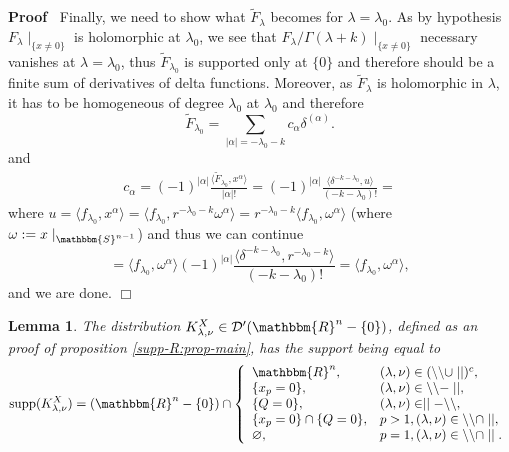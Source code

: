 \documentclass[12pt]{article}
\newcommand{\assign}{:=}
\newcommand{\tmop}[1]{\ensuremath{\operatorname{#1}}}
\renewenvironment{proof}{\noindent\textbf{Proof\ }}{\hspace*{\fill}$\Box$\medskip}
\newtheorem{lemma}[proposition]{Lemma}
\theoremstyle{remark}
\begin{document}
\begin{proof}
  Finally, we need to show what $\tilde{F}_{\lambda}$ becomes for $\lambda =
  \lambda_0$. As by hypothesis $F_{\lambda} \mid_{\{ x \neq 0 \}}$ is
  holomorphic at $\lambda_0$, we see that $F_{\lambda} / \Gamma (\lambda + k)
  \mid_{\{ x \neq 0 \}}$ necessary vanishes at $\lambda = \lambda_0$, thus
  $\tilde{F}_{\lambda_0}$ is supported only at $\{ 0 \}$ and therefore should
  be a finite sum of derivatives of delta functions. Moreover, as
  $\tilde{F}_{\lambda}$ is holomorphic in $\lambda$, it has to be homogeneous
  of degree $\lambda_0$ at $\lambda_0$ and therefore
  \[ \tilde{F}_{\lambda_0} = \sum_{| \alpha | = - \lambda_0 - k} c_{\alpha}
     \delta^{(\alpha)} . \]
  and
  \begin{eqnarray}
    & c_{\alpha} = (- 1)^{| \alpha |} \frac{\langle \tilde{F}_{\lambda_0},
    x^{\alpha} \rangle}{| \alpha | !} = (- 1)^{| \alpha |} \frac{\langle
    \delta^{- k - \lambda_0}, u \rangle}{(- k - \lambda_0) !} = &  \nonumber
  \end{eqnarray}
  where $u = \langle f_{\lambda_0}, x^{\alpha} \rangle = \langle
  f_{\lambda_0}, r^{- \lambda_0 - k} \omega^{\alpha} \rangle = r^{- \lambda_0
  - k} \langle f_{\lambda_0}, \omega^{\alpha} \rangle$ (where $\omega \assign
  x \mid_{\mathbbm{S}^{n - 1}}$) and thus we can continue
  \[ = \langle f_{\lambda_0}, \omega^{\alpha} \rangle (- 1)^{| \alpha |}
     \frac{\langle \delta^{- k - \lambda_0}, r^{- \lambda_0 - k} \rangle}{(- k
     - \lambda_0) !} = \langle f_{\lambda_0}, \omega^{\alpha} \rangle, \]
  and we are done.
\end{proof}

\begin{lemma}
  \label{supp-R:lem-supp-of-K}The distribution $K_{\lambda, \nu}^X \in
  \mathcal{D}' (\mathbbm{R}^n - \{ 0 \})$, defined as an proof of proposition
  \ref{supp-R:prop-main}, has the support being equal to
  \[ \tmop{supp} (K_{\lambda, \nu}^X) = (\mathbbm{R}^n - \{ 0 \}) \cap \left\{
     \begin{array}{ll}
       \mathbbm{R}^n, & (\lambda, \nu) \in (\backslash\backslash \cup \mid
       \mid)^c,\\
       \{ x_p = 0 \}, & (\lambda, \nu) \in \backslash\backslash - \mid \mid,\\
       \{ Q = 0 \}, & (\lambda, \nu) \in \mid \mid -\backslash\backslash,\\
       \{ x_p = 0 \} \cap \{ Q = 0 \}, & p > 1, (\lambda, \nu) \in
       \backslash\backslash \cap \mid \mid,\\
       \varnothing, & p = 1, (\lambda, \nu) \in \backslash\backslash \cap \mid
       \mid .
     \end{array} \right. \]
\end{lemma}
\end{document}
